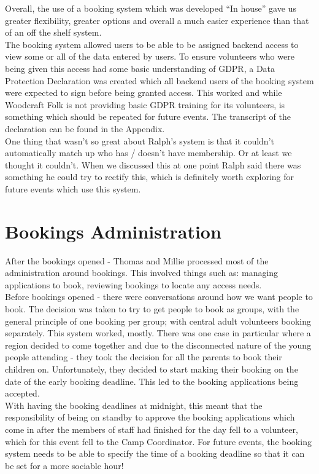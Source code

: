 Overall, the use of a booking system which was developed ``In house'' gave us greater flexibility, greater options and overall a much easier experience than that of an off the shelf system. \\

The booking system allowed users to be able to be assigned backend access to view some or all of the data entered by users. To ensure volunteers who were being given this access had some basic understanding of GDPR, a Data Protection Declaration was created which all backend users of the booking system were expected to sign before being granted access. This worked and while Woodcraft Folk is not providing basic GDPR training for its volunteers, is something which should be repeated for future events. The transcript of the declaration can be found in the Appendix.\\

One thing that wasn't so great about Ralph's system is that it couldn't automatically match up who has / doesn't have membership. Or at least we thought it couldn't. When we discussed this at one point Ralph said there was something he could try to rectify this, which is definitely worth exploring for future events which use this system. 

\section{Bookings Administration}
After the bookings opened - Thomas and Millie processed most of the administration around bookings. This involved things such as: managing applications to book, reviewing bookings to locate any access needs.\\

Before bookings opened - there were conversations around how we want people to book. The decision was taken to try to get people to book as groups, with the general principle of one booking per group; with central adult volunteers booking separately.
This system worked, mostly. There was one case in particular where a region decided to come together and due to the disconnected nature of the young people attending - they took the decision for all the parents to book their children on. Unfortunately, they decided to start making their booking on the date of the early booking deadline. This led to the booking applications being accepted.\\

With having the booking deadlines at midnight, this meant that the responsibility of being on standby to approve the booking applications which come in after the members of staff had finished for the day fell to a volunteer, which for this event fell to the Camp Coordinator. For future events, the booking system needs to be able to specify the time of a booking deadline so that it can be set for a more sociable hour! \\

